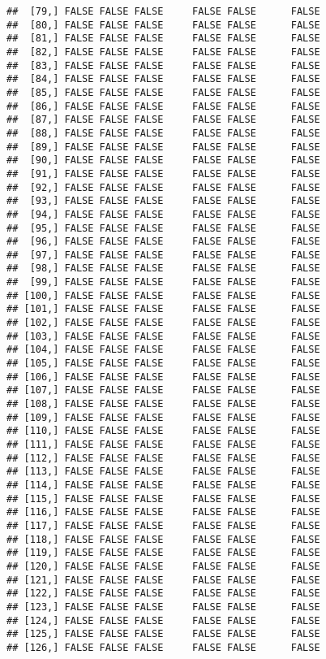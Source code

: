\documentclass[
]{article}
\begin{document}
\begin{verbatim}
##  [79,] FALSE FALSE FALSE     FALSE FALSE      FALSE
##  [80,] FALSE FALSE FALSE     FALSE FALSE      FALSE
##  [81,] FALSE FALSE FALSE     FALSE FALSE      FALSE
##  [82,] FALSE FALSE FALSE     FALSE FALSE      FALSE
##  [83,] FALSE FALSE FALSE     FALSE FALSE      FALSE
##  [84,] FALSE FALSE FALSE     FALSE FALSE      FALSE
##  [85,] FALSE FALSE FALSE     FALSE FALSE      FALSE
##  [86,] FALSE FALSE FALSE     FALSE FALSE      FALSE
##  [87,] FALSE FALSE FALSE     FALSE FALSE      FALSE
##  [88,] FALSE FALSE FALSE     FALSE FALSE      FALSE
##  [89,] FALSE FALSE FALSE     FALSE FALSE      FALSE
##  [90,] FALSE FALSE FALSE     FALSE FALSE      FALSE
##  [91,] FALSE FALSE FALSE     FALSE FALSE      FALSE
##  [92,] FALSE FALSE FALSE     FALSE FALSE      FALSE
##  [93,] FALSE FALSE FALSE     FALSE FALSE      FALSE
##  [94,] FALSE FALSE FALSE     FALSE FALSE      FALSE
##  [95,] FALSE FALSE FALSE     FALSE FALSE      FALSE
##  [96,] FALSE FALSE FALSE     FALSE FALSE      FALSE
##  [97,] FALSE FALSE FALSE     FALSE FALSE      FALSE
##  [98,] FALSE FALSE FALSE     FALSE FALSE      FALSE
##  [99,] FALSE FALSE FALSE     FALSE FALSE      FALSE
## [100,] FALSE FALSE FALSE     FALSE FALSE      FALSE
## [101,] FALSE FALSE FALSE     FALSE FALSE      FALSE
## [102,] FALSE FALSE FALSE     FALSE FALSE      FALSE
## [103,] FALSE FALSE FALSE     FALSE FALSE      FALSE
## [104,] FALSE FALSE FALSE     FALSE FALSE      FALSE
## [105,] FALSE FALSE FALSE     FALSE FALSE      FALSE
## [106,] FALSE FALSE FALSE     FALSE FALSE      FALSE
## [107,] FALSE FALSE FALSE     FALSE FALSE      FALSE
## [108,] FALSE FALSE FALSE     FALSE FALSE      FALSE
## [109,] FALSE FALSE FALSE     FALSE FALSE      FALSE
## [110,] FALSE FALSE FALSE     FALSE FALSE      FALSE
## [111,] FALSE FALSE FALSE     FALSE FALSE      FALSE
## [112,] FALSE FALSE FALSE     FALSE FALSE      FALSE
## [113,] FALSE FALSE FALSE     FALSE FALSE      FALSE
## [114,] FALSE FALSE FALSE     FALSE FALSE      FALSE
## [115,] FALSE FALSE FALSE     FALSE FALSE      FALSE
## [116,] FALSE FALSE FALSE     FALSE FALSE      FALSE
## [117,] FALSE FALSE FALSE     FALSE FALSE      FALSE
## [118,] FALSE FALSE FALSE     FALSE FALSE      FALSE
## [119,] FALSE FALSE FALSE     FALSE FALSE      FALSE
## [120,] FALSE FALSE FALSE     FALSE FALSE      FALSE
## [121,] FALSE FALSE FALSE     FALSE FALSE      FALSE
## [122,] FALSE FALSE FALSE     FALSE FALSE      FALSE
## [123,] FALSE FALSE FALSE     FALSE FALSE      FALSE
## [124,] FALSE FALSE FALSE     FALSE FALSE      FALSE
## [125,] FALSE FALSE FALSE     FALSE FALSE      FALSE
## [126,] FALSE FALSE FALSE     FALSE FALSE      FALSE

\end{verbatim}
\end{document}
